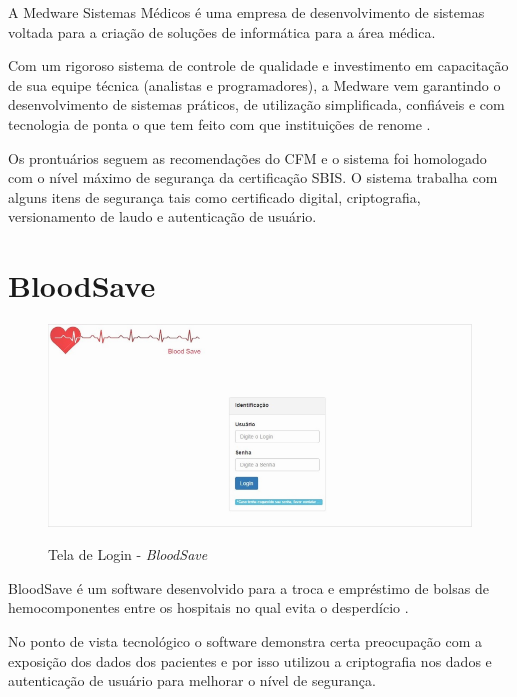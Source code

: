 \documentclass[portuguese,oneside]{tcc}
\begin{document}
A Medware Sistemas Médicos é uma empresa de desenvolvimento de sistemas voltada para a criação de soluções de informática para a área médica.

Com um rigoroso sistema de controle de qualidade e investimento em capacitação de sua equipe técnica (analistas e programadores), a Medware vem garantindo o desenvolvimento de sistemas práticos, de utilização simplificada, confiáveis e com tecnologia de ponta o que tem feito com que instituições de renome \cite{MEDWARE}.

Os prontuários seguem as recomendações do CFM e o sistema foi homologado com o nível máximo de segurança da certificação SBIS. O sistema trabalha com alguns itens de segurança tais como certificado digital, criptografia, versionamento de laudo e autenticação de usuário.


\newpage

\section{BloodSave}

\begin{figure}[htp]
\centering
\caption{Tela de Login - \textit{BloodSave}}
\includegraphics[width=15cm]{bloodsave}
\label{fig:bloodsave}
\end{figure}

BloodSave é um software desenvolvido para a troca e empréstimo de bolsas de hemocomponentes entre os hospitais no qual evita o desperdício \cite{SANGUE}.
 
No ponto de vista tecnológico o software demonstra certa preocupação com a exposição dos dados dos pacientes e por isso utilizou a criptografia nos dados e autenticação de usuário para melhorar o nível de segurança.

\end{document}
